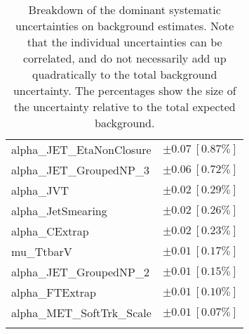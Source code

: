 \begin{table}
\begin{center}
\begin{tabular*}{\textwidth}{@{\extracolsep{\fill}}lc}
alpha\_JET\_EtaNonClosure         & $\pm 0.07\ [0.87\%] $       \\
alpha\_JET\_GroupedNP\_3         & $\pm 0.06\ [0.72\%] $       \\
alpha\_JVT         & $\pm 0.02\ [0.29\%] $       \\
alpha\_JetSmearing         & $\pm 0.02\ [0.26\%] $       \\
alpha\_CExtrap         & $\pm 0.02\ [0.23\%] $       \\
mu\_TtbarV         & $\pm 0.01\ [0.17\%] $       \\
alpha\_JET\_GroupedNP\_2         & $\pm 0.01\ [0.15\%] $       \\
alpha\_FTExtrap         & $\pm 0.01\ [0.10\%] $       \\
alpha\_MET\_SoftTrk\_Scale         & $\pm 0.01\ [0.07\%] $       \\
\noalign{\smallskip}\hline\noalign{\smallskip}
\end{tabular*}
\end{center}
\caption[Breakdown of uncertainty on background estimates]{
Breakdown of the dominant systematic uncertainties on background estimates.
Note that the individual uncertainties can be correlated, and do not necessarily add up quadratically to 
the total background uncertainty. The percentages show the size of the uncertainty relative to the total expected background.
\label{table.results.bkgestimate.uncertainties.SRC4}}
\end{table}
%
